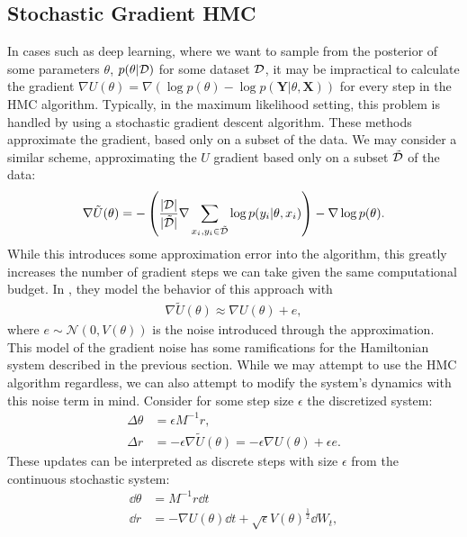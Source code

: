 \subsection{Stochastic Gradient HMC}
In cases such as deep learning, where we want to sample from the posterior of some parameters $\theta$,  $p(\theta | \mathcal{D})$ for some dataset $\mathcal{D}$, it may be impractical to calculate the gradient $\nabla U(\theta) = \nabla\left( \log{p(\theta)} - \log{p(\bm{Y} | \theta, \bm{X})} \right)$ for every step in the HMC algorithm. 
Typically, in the maximum likelihood setting, this problem is handled by using a stochastic gradient descent algorithm. 
These methods approximate the gradient, based only on a subset of the data. 
We may consider a similar scheme, approximating the $U$ gradient based only on a subset $\tilde{\mathcal{D}}$ of the data:
\begin{align}
    \nabla\tilde{U}(\theta) = -\left(\frac{|\mathcal{D}|}{|\tilde{\mathcal{D}}|}  \nabla \sum_{x_i, y_i\in \tilde{\mathcal{D}}} \log{p(y_i |\theta, x_i)}\right)  -\nabla \log{p(\theta)}.
\end{align}
While this introduces some approximation error into the algorithm, this greatly increases the number of gradient steps we can take given the same computational budget.
In \autocite{chen_stochastic_2014}, they model the behavior of this approach with
\begin{align} \label{eq:sghmc-model}
    \nabla\tilde{U}(\theta) \approx \nabla{U}(\theta) + e,
\end{align}
where $e \sim \mathcal{N}(0, V(\theta))$ is the noise introduced through the approximation.
This model of the gradient noise has some ramifications for the Hamiltonian system described in the previous section. 
While we may attempt to use the HMC algorithm regardless, we can also attempt to modify the system's dynamics with this noise term in mind.
Consider for some step size $\epsilon$ the discretized system:
\begin{align}
    \Delta \theta &=  \epsilon M^{-1} r, \label{eq:ds1}\\
    \Delta r &=  -\epsilon\nabla{\tilde{U}}(\theta) = -\epsilon\nabla{U}(\theta)  + \epsilon e.\label{eq:ds2}
\end{align}
These updates can be interpreted as discrete steps with size $\epsilon$ from the continuous stochastic system:
\begin{align} 
    \dd{\theta} &= M^{-1} r\dd{t} \\
    \dd{r} &= -\nabla{U}(\theta)\dd{t}  + \sqrt{\epsilon} V(\theta)^{\frac{1}{2}} \dd{W_t},
\end{align}
